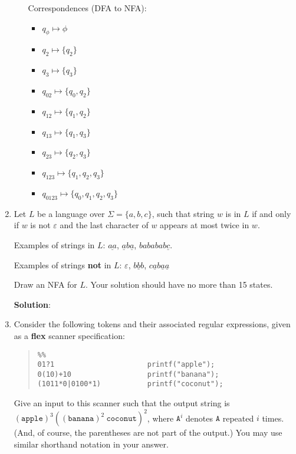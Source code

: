 \documentclass[11pt]{article}
\renewcommand{\epsilon}{\varepsilon}
\begin{document}
\begin{enumerate}
\begin{enumerate}
    Correspondences (DFA to NFA):
    \begin{itemize}
        \item %
        $q_{\phi} \mapsto \phi$
        \item
        $q_2 \mapsto \{q_2\}$
        \item
        $q_3 \mapsto \{q_3\}$
        \item
        $q_{02} \mapsto \{q_0, q_2\}$
        \item
        $q_{12} \mapsto \{q_1, q_2\}$
        \item
        $q_{13} \mapsto \{q_1, q_3\}$
        \item
        $q_{23} \mapsto \{q_2, q_3\}$
        \item
        $q_{123} \mapsto \{q_1, q_2, q_3\}$
        \item
        $q_{0123} \mapsto \{q_0, q_1, q_2, q_3\}$
    \end{itemize}
\end{enumerate}

\newpage

\item Let $L$ be a language over $\Sigma = \{a, b, c\}$, such that string $w$ is in $L$ if and only if $w$ is not $\epsilon$ and the last character of $w$ appears at most twice in $w$.

Examples of strings in $L$: $\underline{aa}$, $\underline{a}b\underline{a}$, $bababab\underline{c}$.

Examples of strings \textbf{not} in $L$: $\epsilon$, $\underline{bbb}$, $c\underline{a}b\underline{a}\underline{a}$

Draw an NFA for $L$.  Your solution should have no more than 15 states.

\textbf{Solution}:

\newpage

\item Consider the following tokens and their associated regular expressions, given as a \textbf{flex} scanner specification:
\begin{quote}
\begin{lstlisting}
%%
01?1                      printf("apple");
0(10)+10                  printf("banana");
(1011*0|0100*1)           printf("coconut");
\end{lstlisting}
\end{quote}
Give an input to this scanner such that the output string is $(\mathtt{apple})^3 ((\mathtt{banana})^2 \ \mathtt{coconut})^2$, where $\mathtt{A}^i$ denotes $\mathtt{A}$ repeated $i$ times.   (And, of course, the parentheses are not part of the output.)  You may use similar shorthand notation in your answer.


\end{enumerate}
\end{document}
